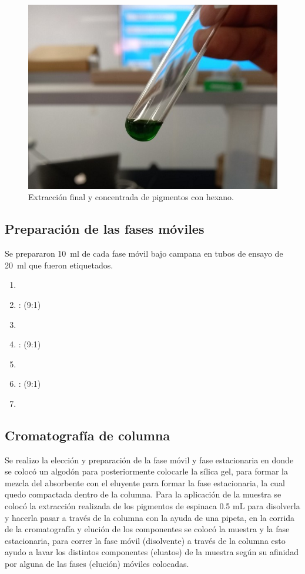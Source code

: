 \documentclass{ITESO-Reporte}
\begin{document}
\begin{figure}[htpb]
    \centering
    \includegraphics[width=0.9\columnwidth]{figuras/final_extract.jpg}
    \caption{Extracción final y concentrada de pigmentos con hexano.}
    \label{fig:final-extract}
\end{figure}

\subsection{Preparación de las fases móviles}\label{fases moviles}

Se prepararon \qty{10}{\ml} de cada fase móvil bajo campana en tubos de ensayo de \qty{20}{\ml} que fueron etiquetados.

\begin{enumerate}
    \setlength{\itemsep}{0pt}
    \item {}
    \item {}: (9:1)
    \item {}
    \item {}: (9:1)
    \item {}
    \item {}: (9:1)
    \item {}
\end{enumerate}

\subsection{Cromatografía de columna}\label{cromatografia}

Se realizo la elección y preparación de la fase móvil y fase estacionaria en donde se colocó un algodón para posteriormente colocarle la sílica gel, para formar la mezcla del absorbente con el eluyente para formar la fase estacionaria, la cual quedo compactada dentro de la columna. Para la aplicación de la muestra se colocó la extracción realizada de los pigmentos de espinaca 0.5 mL para disolverla y hacerla pasar a través de la columna con la ayuda de una pipeta, en la corrida de la cromatografía y elución de los componentes se colocó la muestra y la fase estacionaria, para correr la fase móvil (disolvente) a través de la columna esto ayudo a lavar los distintos componentes (eluatos) de la muestra según su afinidad por alguna de las fases (elución) móviles colocadas.
\end{document}
